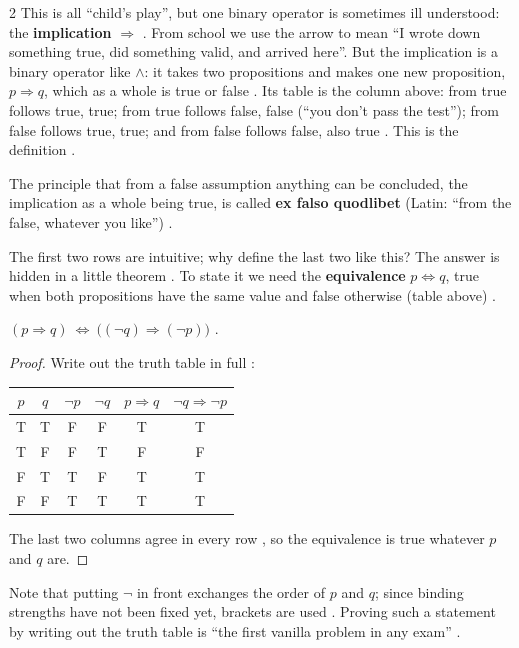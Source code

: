 \begin{paracol}{2}
This is all ``child's play'', but one binary operator is sometimes ill understood: the \textbf{implication}
$\Rightarrow$ . From school we use the arrow to mean ``I wrote down something true, did something
valid, and arrived here''. But the implication is a binary operator like $\wedge$: it takes two propositions
and makes one new proposition, $p\Rightarrow q$, which as a whole is true or false . Its table
is the column above: from true follows true, true; from true follows false, false (``you don't pass the
test''); from false follows true, true; and from false follows false, also true . This is the
definition .

\begin{definition}\label{def:lo-exfalso}
The principle that from a false assumption anything can be concluded, the implication as a whole being true,
is called \textbf{ex falso quodlibet} (Latin: ``from the false, whatever you like'') .
\end{definition}

The first two rows are intuitive; why define the last two like this? The answer is hidden in a little
theorem . To state it we need the \textbf{equivalence} $p\Leftrightarrow q$, true when both
propositions have the same value and false otherwise (table above) .

\begin{theorem}[Contraposition]\label{thm:lo-contra}
$(p\Rightarrow q)\ \Leftrightarrow\ \bigl((\neg q)\Rightarrow(\neg p)\bigr)$ .
\end{theorem}
\begin{proof}
Write out the truth table in full :
\begin{center}
\renewcommand{\arraystretch}{1.3}
\begin{tabular}{cc|cc|cc}
$p$ & $q$ & $\neg p$ & $\neg q$ & $p\Rightarrow q$ & $\neg q\Rightarrow\neg p$\\\hline
T & T & F & F & T & T\\
T & F & F & T & F & F\\
F & T & T & F & T & T\\
F & F & T & T & T & T
\end{tabular}
\end{center}
The last two columns agree in every row , so the equivalence is true whatever $p$ and $q$ are.
\end{proof}
Note that putting $\neg$ in front exchanges the order of $p$ and $q$; since binding strengths have not been
fixed yet, brackets are used . Proving such a statement by writing out the truth table is ``the
first vanilla problem in any exam'' .


\end{paracol}
